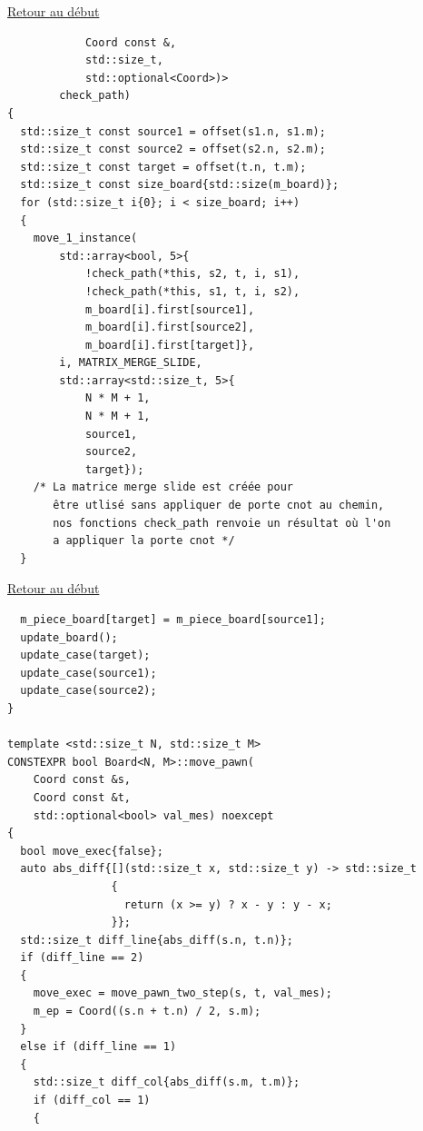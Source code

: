 {\begin{frame}[fragile]
\hyperlink{conclusion}{Retour au début}\newline
\begin{verbatim}
            Coord const &,
            std::size_t,
            std::optional<Coord>)>
        check_path)
{
  std::size_t const source1 = offset(s1.n, s1.m);
  std::size_t const source2 = offset(s2.n, s2.m);
  std::size_t const target = offset(t.n, t.m);
  std::size_t const size_board{std::size(m_board)};
  for (std::size_t i{0}; i < size_board; i++)
  {
    move_1_instance(
        std::array<bool, 5>{
            !check_path(*this, s2, t, i, s1),
            !check_path(*this, s1, t, i, s2),
            m_board[i].first[source1],
            m_board[i].first[source2],
            m_board[i].first[target]},
        i, MATRIX_MERGE_SLIDE,
        std::array<std::size_t, 5>{
            N * M + 1,
            N * M + 1,
            source1,
            source2,
            target});
    /* La matrice merge slide est créée pour
       être utlisé sans appliquer de porte cnot au chemin,
       nos fonctions check_path renvoie un résultat où l'on
       a appliquer la porte cnot */
  }
\end{verbatim}
\end{frame}

\begin{frame}[fragile]
\hyperlink{conclusion}{Retour au début}\newline
\begin{verbatim}
  m_piece_board[target] = m_piece_board[source1];
  update_board();
  update_case(target);
  update_case(source1);
  update_case(source2);
}

template <std::size_t N, std::size_t M>
CONSTEXPR bool Board<N, M>::move_pawn(
    Coord const &s,
    Coord const &t,
    std::optional<bool> val_mes) noexcept
{
  bool move_exec{false};
  auto abs_diff{[](std::size_t x, std::size_t y) -> std::size_t
                {
                  return (x >= y) ? x - y : y - x;
                }};
  std::size_t diff_line{abs_diff(s.n, t.n)};
  if (diff_line == 2)
  {
    move_exec = move_pawn_two_step(s, t, val_mes);
    m_ep = Coord((s.n + t.n) / 2, s.m);
  }
  else if (diff_line == 1)
  {
    std::size_t diff_col{abs_diff(s.m, t.m)};
    if (diff_col == 1)
    {

\end{verbatim}
\end{frame}

}
